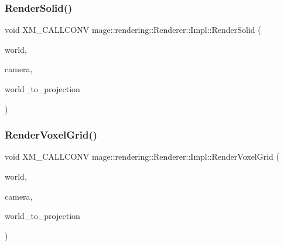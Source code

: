 \subsubsection{\texorpdfstring{Render\+Solid()}{RenderSolid()}}
{\footnotesize\ttfamily void X\+M\+\_\+\+C\+A\+L\+L\+C\+O\+NV mage\+::rendering\+::\+Renderer\+::\+Impl\+::\+Render\+Solid (\begin{DoxyParamCaption}\item[{const \hyperlink{classmage_1_1rendering_1_1_world}{World} \&}]{world,  }\item[{const \hyperlink{classmage_1_1rendering_1_1_camera}{Camera} \&}]{camera,  }\item[{F\+X\+M\+M\+A\+T\+R\+IX}]{world\+\_\+to\+\_\+projection }\end{DoxyParamCaption})\hspace{0.3cm}{\ttfamily [private]}}

\hypertarget{classmage_1_1rendering_1_1_renderer_1_1_impl_adb7265bf1333368a57e5071ef3f56fca}{}\label{classmage_1_1rendering_1_1_renderer_1_1_impl_adb7265bf1333368a57e5071ef3f56fca} 
\subsubsection{\texorpdfstring{Render\+Voxel\+Grid()}{RenderVoxelGrid()}}
{\footnotesize\ttfamily void X\+M\+\_\+\+C\+A\+L\+L\+C\+O\+NV mage\+::rendering\+::\+Renderer\+::\+Impl\+::\+Render\+Voxel\+Grid (\begin{DoxyParamCaption}\item[{const \hyperlink{classmage_1_1rendering_1_1_world}{World} \&}]{world,  }\item[{const \hyperlink{classmage_1_1rendering_1_1_camera}{Camera} \&}]{camera,  }\item[{F\+X\+M\+M\+A\+T\+R\+IX}]{world\+\_\+to\+\_\+projection }\end{DoxyParamCaption})\hspace{0.3cm}{\ttfamily [private]}}

\hypertarget{classmage_1_1rendering_1_1_renderer_1_1_impl_acbf6274f82a95beac2543c8e642c309c}{}\label{classmage_1_1rendering_1_1_renderer_1_1_impl_acbf6274f82a95beac2543c8e642c309c} 
